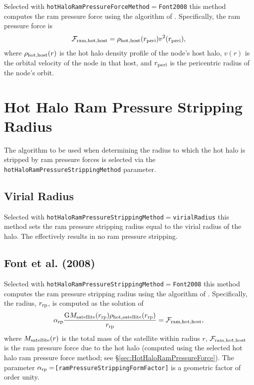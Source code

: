 Selected with {\tt hotHaloRamPressureForceMethod}$=${\tt Font2008} this method computes the ram pressure force using the algorithm of \cite{font_colours_2008}. Specifically, the ram pressure force is
\begin{equation}
\mathcal{F}_{\rm ram, hot, host} = \rho_{\rm hot, host}(r_{\rm peri}) v^2(r_{\rm peri}),
\end{equation}
where $\rho_{\rm hot, host}(r)$ is the hot halo density profile of the node's host halo, $v(r)$ is the orbital velocity of the node in that host, and $r_{\rm peri}$ is the pericentric radius of the node's orbit.

\section{Hot Halo Ram Pressure Stripping Radius}\label{sec:HotHaloRamPressureStrip}

The algorithm to be used when determining the radius to which the hot halo is stripped by ram pressure forces is selected via the {\tt hotHaloRamPressureStrippingMethod} parameter.

\subsection{Virial Radius}

Selected with {\tt hotHaloRamPressureStrippingMethod}$=${\tt virialRadius} this method sets the ram pressure stripping radius equal to the virial radius of the halo. The effectively results in no ram pressure stripping.

\subsection{Font et al. (2008)}

Selected with {\tt hotHaloRamPressureStrippingMethod}$=${\tt Font2008} this method computes the ram pressure stripping radius using the algorithm of \cite{font_colours_2008}. Specifically, the radius, $r_{\rm rp}$, is computed as the solution of
\begin{equation}
\alpha_{\rm rp} {{\rm G} M_{\rm satellite}(r_{\rm rp}) \rho_{\rm hot, satellite}(r_{\rm rp}) \over r_{\rm rp} } = \mathcal{F}_{\rm ram, hot, host},
\end{equation}
where $M_{\rm satellite}(r)$ is the total mass of the satellite within radius $r$, $\mathcal{F}_{\rm ram, hot, host}$ is the ram pressure force due to the hot halo (computed using the selected hot halo ram pressure force method; see \S\ref{sec:HotHaloRamPressureForce}). The parameter $\alpha_{\rm rp}=${\tt [ramPressureStrippingFormFactor]} is a geometric factor of order unity.


